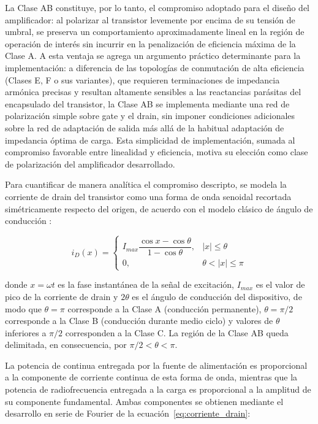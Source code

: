 La Clase AB constituye, por lo tanto, el compromiso adoptado para el diseño del amplificador: al polarizar al transistor levemente por encima de su tensión de umbral, se preserva un comportamiento aproximadamente lineal en la región de operación de interés sin incurrir en la penalización de eficiencia máxima de la Clase A. A esta ventaja se agrega un argumento práctico determinante para la implementación: a diferencia de las topologías de conmutación de alta eficiencia (Clases E, F o sus variantes), que requieren terminaciones de impedancia armónica precisas y resultan altamente sensibles a las reactancias parásitas del encapsulado del transistor, la Clase AB se implementa mediante una red de polarización simple sobre gate y el drain, sin imponer condiciones adicionales sobre la red de adaptación de salida más allá de la habitual adaptación de impedancia óptima de carga. Esta simplicidad de implementación, sumada al compromiso favorable entre linealidad y eficiencia, motiva su elección como clase de polarización del amplificador desarrollado.

Para cuantificar de manera analítica el compromiso descripto, se modela la corriente de drain del transistor como una forma de onda senoidal recortada simétricamente respecto del origen, de acuerdo con el modelo clásico de ángulo de conducción \cite{Cripps2006}:

\begin{equation}
    i_D(x) =
    \begin{cases}
        I_{max} \dfrac{\cos x - \cos\theta}{1-\cos\theta}, & |x| \le \theta \\[6pt]
        0, & \theta < |x| \le \pi
    \end{cases}
    \label{eq:corriente_drain}
\end{equation}

donde $x = \omega t$ es la fase instantánea de la señal de excitación, $I_{max}$ es el valor de pico de la corriente de drain y $2\theta$ es el ángulo de conducción del dispositivo, de modo que $\theta = \pi$ corresponde a la Clase A (conducción permanente), $\theta = \pi/2$ corresponde a la Clase B (conducción durante medio ciclo) y valores de $\theta$ inferiores a $\pi/2$ corresponden a la Clase C. La región de la Clase AB queda delimitada, en consecuencia, por $\pi/2 < \theta < \pi$.

La potencia de continua entregada por la fuente de alimentación es proporcional a la componente de corriente continua de esta forma de onda, mientras que la potencia de radiofrecuencia entregada a la carga es proporcional a la amplitud de su componente fundamental. Ambas componentes se obtienen mediante el desarrollo en serie de Fourier de la ecuación~\eqref{eq:corriente_drain}:


